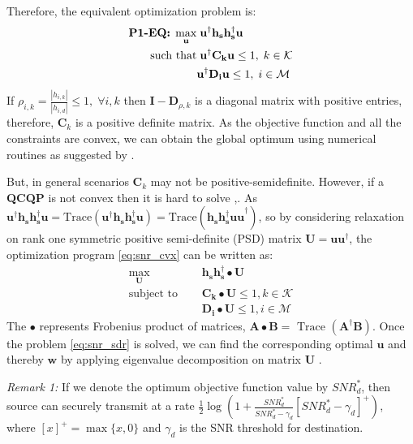 \documentclass[journal,,draftclsnofoot letterpaper, onecolumn]{IEEEtran}
\begin{document}
Therefore, the equivalent optimization problem is:
\begin{subequations}
\label{eq:snr_cvx}
\begin{align}
\text{\textbf{P1-EQ:}}\;\max_\mathbf{u}&\; \mathbf{u^\dagger h_sh_s^\dagger u}\\
\text{such that}&\;\mathbf{u^\dagger C_ku} \le 1,\;k \in \mathcal{K}\\&\mathbf{u^\dagger D_iu} \le 1, \; i \in \mathcal{M}\end{align}
\end{subequations}
If $\rho_{i,k}=\frac{|h_{i,k}|}{|h_{i,d}|}\le 1,\;\forall i,k$ then $\mathbf{I}-\mathbf{D}_{\rho,k}$ is a diagonal matrix with positive entries, therefore, $\mathbf{C}_k$ is a positive definite matrix.
As the objective function and all the constraints are convex, 
we can obtain the global optimum using numerical routines as suggested by \cite{hiriart2001global}.
\par But, in general scenarios $\mathbf{C}_k$ may not be positive-semidefinite.  However, if a \textbf{QCQP} is not convex then it is hard to solve \cite{ANDREA},\cite{luo2010semidefinite}. As $\mathbf{u^\dagger h_sh_s^\dagger u}=\text{Trace}(\mathbf{u^\dagger h_sh_s^\dagger u})=\text{Trace}(\mathbf{h_sh_s^\dagger uu}^\dagger)$, so by considering relaxation on rank one symmetric positive semi-definite (PSD) matrix $\mathbf{U}=\mathbf{uu}^\dagger$, the optimization program \ref{eq:snr_cvx} can be written as:
\begin{subequations}\label{eq:snr_sdr}
\begin{align}
\max_{\mathbf{U}}& \quad \mathbf{h_sh_s^\dagger \bullet U}\\
\text{subject to }& \quad \mathbf{C_k\bullet U} \le 1, k \in \mathcal{K}\\
& \quad \mathbf{D_i\bullet U} \le 1, i \in \mathcal{M}
\end{align}
\end{subequations}
The $\bullet$ represents Frobenius product of matrices, $\mathbf{A \bullet B}=\text{ Trace }(\mathbf{A^\dagger B})$. Once the problem \ref{eq:snr_sdr} is solved, we can find the corresponding optimal $\mathbf{u}$ and thereby $\mathbf{w}$ by applying eigenvalue decomposition on matrix $\mathbf{U}$ \cite{luo2010semidefinite}.


\textit{Remark 1:} If we denote the optimum objective function value by $SNR_d^*$, then source can securely transmit at a rate $\frac{1}{2}\log(1+\frac{SNR_d^*}{SNR_d^*-\gamma_d}[SNR_d^*-\gamma_d]^+)$,
where $[x]^+=\max\{x,0\}$ and $\gamma_d$ is the SNR threshold for destination.
   
\end{document}
